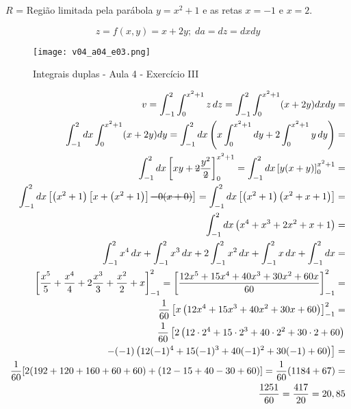 \begin{enumerate}
	$R$ = Região limitada pela parábola $y = x^2 + 1$ e as retas $x = -1$ e $x = 2$.
	
	\begin{equation*}
		z = f(x,y) = x + 2y;\; da = dz = dx dy
	\end{equation*}
	
	\begin{figure}[htb]
		\caption{Integrais duplas - Aula 4 - Exercício III}
		\label{v04_a04_e03}
		\centering
		\texttt{[image: v04\_a04\_e03.png]}		
	\end{figure}
	
	\begin{align*}
		v = \int_{-1}^2 \int_0^{x^2 + 1} z\, dz = \int_{-1}^2 \int_0^{x^2 + 1} (x + 2y) dx dy =\\ \int_{-1}^2 dx \int_0^{x^2 + 1} (x + 2y) dy = \int_{-1}^2 dx \left(x\int_0^{x^2 + 1} dy + 2\int_0^{x^2 + 1} y\, dy\right) =\\ \int_{-1}^2 dx \left[xy + \overstrike{2}\dfrac{y^2}{\overstrike{2}}\right]_0^{x^2 + 1} = \int_{-1}^2 dx \left[y(x + y)\right]_0^{x^2 + 1} =\\ \int_{-1}^2 dx \left[\left(x^2 + 1\right)\left[x + \left(x^2 + 1\right)\right] \overstrike{- 0(x + 0)}\right] = \int_{-1}^2 dx \left[\left(x^2 + 1\right)\left(x^2 + x + 1\right)\right] =\\ \int_{-1}^2 dx \left(x^4 + x^3 + 2x^2 + x + 1\right) =\\ \int_{-1}^2 x^4\, dx + \int_{-1}^2 x^3\, dx + 2\int_{-1}^2 x^2\, dx + \int_{-1}^2 x\, dx + \int_{-1}^2 dx =\\ \left[\dfrac{x^5}{5} + \dfrac{x^4}{4} + 2\dfrac{x^3}{3} + \dfrac{x^2}{2} + x\right]_{-1}^2 = \left[\dfrac{12x^5 + 15x^4 + 40x^3 + 30x^2 + 60x}{60}\right]_{-1}^2 =\\ \dfrac{1}{60}\left[x\left(12x^4 + 15x^3 + 40x^2 + 30x + 60\right)\right]_{-1}^2 =\\ \dfrac{1}{60}\left[2\left(12\cdot2^4 + 15\cdot2^3 + 40\cdot2^2 + 30\cdot2 + 60\right) \right.\\\left.- (-1)\left(12(-1)^4 + 15(-1)^3 + 40(-1)^2 + 30(-1) + 60\right)\right] =\\ \dfrac{1}{60} [2(192 + 120 + 160 + 60 + 60) + (12 - 15 + 40 - 30 + 60)] = \dfrac{1}{60} (1184 + 67) =\\ \dfrac{1251}{60} = \frac{417}{20} = 20,85
	\end{align*}
\end{enumerate}